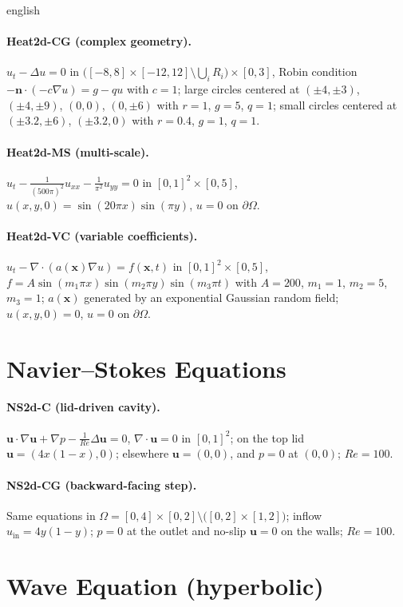\documentclass[12pt,letterpaper,twoside]{book}
\begin{document}
\begin{hyphenrules}{english}
\paragraph{Heat2d-CG (complex geometry).} $u_t-\Delta u=0$ in
$\big([-8,8]\times[-12,12]\setminus\bigcup_iR_i\big)\times[0,3]$, Robin condition
$-\mathbf{n}\cdot(-c\nabla u)=g-qu$ with $c=1$; large circles centered at $(\pm4,\pm3)$, $(\pm4,\pm9)$, $(0,0)$,
$(0,\pm6)$ with $r=1$, $g=5$, $q=1$; small circles centered at $(\pm3.2,\pm6)$, $(\pm3.2,0)$ with $r=0.4$,
$g=1$, $q=1$.

\paragraph{Heat2d-MS (multi-scale).} $u_t-\frac{1}{(500\pi)^2}u_{xx}-\frac{1}{\pi^2}u_{yy}=0$ in
$[0,1]^2\times[0,5]$, $u(x,y,0)=\sin(20\pi x)\sin(\pi y)$, $u=0$ on $\partial\Omega$.

\paragraph{Heat2d-VC (variable coefficients).} $u_t-\nabla\cdot(a(\mathbf{x})\nabla u)=f(\mathbf{x},t)$ in
$[0,1]^2\times[0,5]$, $f=A\sin(m_1\pi x)\sin(m_2\pi y)\sin(m_3\pi t)$ with $A=200$, $m_1=1$, $m_2=5$,
$m_3=1$; $a(\mathbf{x})$ generated by an exponential Gaussian random field; $u(x,y,0)=0$, $u=0$ on $\partial\Omega$.

\section{Navier--Stokes Equations}
\paragraph{NS2d-C (lid-driven cavity).} $\mathbf{u}\cdot\nabla\mathbf{u}+\nabla p-\frac{1}{Re}\Delta\mathbf{u}=0$,
$\nabla\cdot\mathbf{u}=0$ in $[0,1]^2$; on the top lid $\mathbf{u}=(4x(1-x),0)$; elsewhere $\mathbf{u}=(0,0)$,
and $p=0$ at $(0,0)$; $Re=100$.

\paragraph{NS2d-CG (backward-facing step).} Same equations in
$\Omega=[0,4]\times[0,2]\setminus\big([0,2]\times[1,2]\big)$; inflow $u_{\mathrm{in}}=4y(1-y)$; $p=0$ at the
outlet and no-slip $\mathbf{u}=0$ on the walls; $Re=100$.

\section{Wave Equation (hyperbolic)}

\end{hyphenrules}
\end{document}
